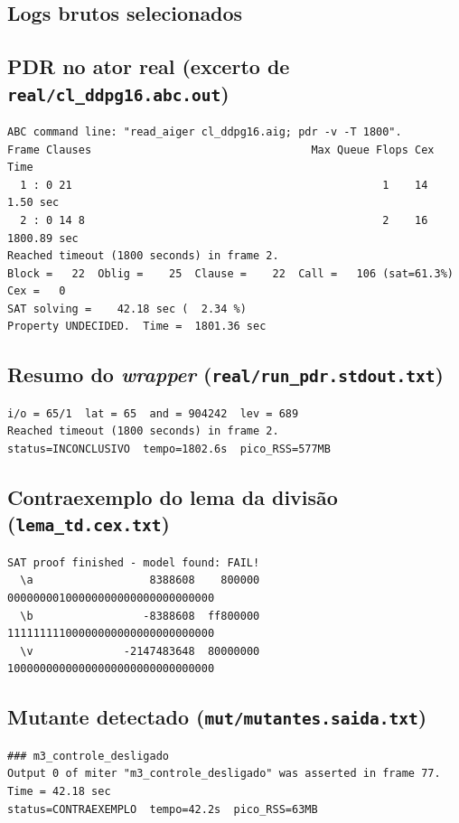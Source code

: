 \documentclass[12pt,openright,oneside,a4paper,chapter=TITLE,sumario=tradicional,english,brazil]{abntex2}
\begin{document}
\begin{apendicesenv}
\partapendices

\chapter{Logs brutos selecionados}\label{ap:log}

\section{PDR no ator real (excerto de \texttt{real/cl\_ddpg16.abc.out})}
\begin{lstlisting}
ABC command line: "read_aiger cl_ddpg16.aig; pdr -v -T 1800".
Frame Clauses                                  Max Queue Flops Cex      Time
  1 : 0 21                                                1    14      1.50 sec
  2 : 0 14 8                                              2    16   1800.89 sec
Reached timeout (1800 seconds) in frame 2.
Block =   22  Oblig =    25  Clause =    22  Call =   106 (sat=61.3%)  Cex =   0
SAT solving =    42.18 sec (  2.34 %)
Property UNDECIDED.  Time =  1801.36 sec
\end{lstlisting}

\section{Resumo do \emph{wrapper} (\texttt{real/run\_pdr.stdout.txt})}
\begin{lstlisting}
i/o = 65/1  lat = 65  and = 904242  lev = 689
Reached timeout (1800 seconds) in frame 2.
status=INCONCLUSIVO  tempo=1802.6s  pico_RSS=577MB
\end{lstlisting}

\section{Contraexemplo do lema da divisão (\texttt{lema\_td.cex.txt})}
\begin{lstlisting}
SAT proof finished - model found: FAIL!
  \a                  8388608    800000   00000000100000000000000000000000
  \b                 -8388608  ff800000   11111111100000000000000000000000
  \v              -2147483648  80000000   10000000000000000000000000000000
\end{lstlisting}

\section{Mutante detectado (\texttt{mut/mutantes.saida.txt})}
\begin{lstlisting}
### m3_controle_desligado
Output 0 of miter "m3_controle_desligado" was asserted in frame 77.  Time = 42.18 sec
status=CONTRAEXEMPLO  tempo=42.2s  pico_RSS=63MB
\end{lstlisting}


\end{apendicesenv}
\end{document}
